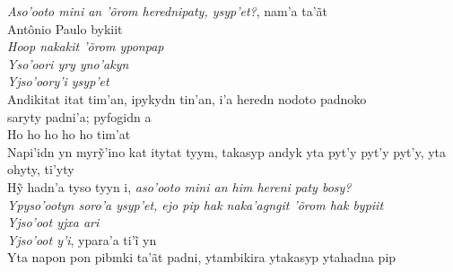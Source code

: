 \noindent   \textit{Aso'ooto mini an 'õrom herednipaty, ysyp'et?}, nam'a ta'ãt\\
 Antônio Paulo bykiit\\
  \textit{Hoop nakakit 'õrom yponpap}\\
  \textit{Yso'oori yry yno'akyn}\\
  \textit{Yjso'oory'i ysyp'et}\\
  Andikitat itat tim'an, ipykydn tin'an, i'a heredn nodoto padnoko\\
 saryty padni'a; pyfogidn a\\
  Ho ho ho ho ho tim'at\\
  Napi’idn yn myrỹ’ino kat itytat tyym, takasyp andyk yta pyt’y pyt’y pyt’y, yta ohyty, ti’yty\\
  Hỹ hadn’a tyso tyyn i, \textit{aso’ooto mini an him hereni paty bosy?}\\
  \textit{Ypyso'ootyn soro'a ysyp'et, ejo pip hak naka'agngit 'õrom hak bypiit}\\
  \textit{Yjso'oot yjxa ari}\\
  \textit{Yjso’oot y’i}, ypara’a ti’ĩ yn\\
  Yta napon pon pibmki ta'ãt padni, ytambikira ytakasyp ytahadna pip

\smallskip
 \begin{center}\end{center}
 \smallskip

